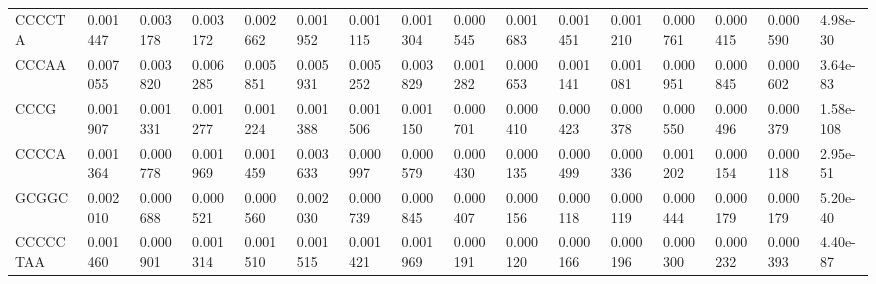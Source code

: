 \begin{samepage}
\begin{table}[h!]
\begin{tabular}{llllllllllllllll}
CCCCTA            &  0.001447                                          &  0.003178                            &  0.003172                 &  0.002662        &  0.001952        &  0.001115        &  0.001304        &  0.000545        &  0.001683        &  0.001451        &  0.001210        &  0.000761        &  0.000415        &  0.000590        &  4.98e-30 \\
CCCAA             &  0.007055                                          &  0.003820                            &  0.006285                 &  0.005851        &  0.005931        &  0.005252        &  0.003829        &  0.001282        &  0.000653        &  0.001141        &  0.001081        &  0.000951        &  0.000845        &  0.000602        &  3.64e-83 \\
CCCG              &  0.001907                                          &  0.001331                            &  0.001277                 &  0.001224        &  0.001388        &  0.001506        &  0.001150        &  0.000701        &  0.000410        &  0.000423        &  0.000378        &  0.000550        &  0.000496        &  0.000379        &  1.58e-108 \\
CCCCA             &  0.001364                                          &  0.000778                            &  0.001969                 &  0.001459        &  0.003633        &  0.000997        &  0.000579        &  0.000430        &  0.000135        &  0.000499        &  0.000336        &  0.001202        &  0.000154        &  0.000118        &  2.95e-51 \\
GCGGC             &  0.002010                                          &  0.000688                            &  0.000521                 &  0.000560        &  0.002030        &  0.000739        &  0.000845        &  0.000407        &  0.000156        &  0.000118        &  0.000119        &  0.000444        &  0.000179        &  0.000179        &  5.20e-40 \\
CCCCCTAA          &  0.001460                                          &  0.000901                            &  0.001314                 &  0.001510        &  0.001515        &  0.001421        &  0.001969        &  0.000191        &  0.000120        &  0.000166        &  0.000196        &  0.000300        &  0.000232        &  0.000393        &  4.40e-87 \\
\hline
\end{tabular}
\caption{}
\label{}
\end{table}
\end{samepage}
